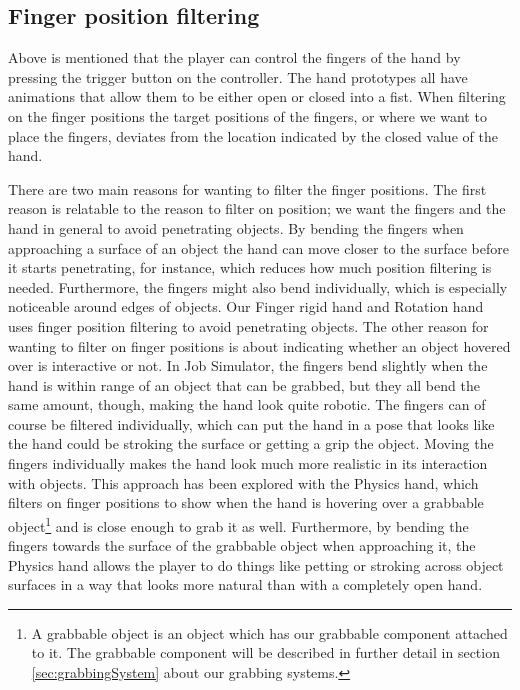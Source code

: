 \subsection{Finger position filtering}
\label{subsec:categoryFingerFiltering}
Above is mentioned that the player can control the fingers of the hand by pressing the trigger button on the controller. The hand prototypes all have animations that allow them to be either open or closed into a fist. When filtering on the finger positions the target positions of the fingers, or where we want to place the fingers, deviates from the location indicated by the closed value of the hand.

There are two main reasons for wanting to filter the finger positions. The first reason is relatable to the reason to filter on position; we want the fingers and the hand in general to avoid penetrating objects. By bending the fingers when approaching a surface of an object the hand can move closer to the surface before it starts penetrating, for instance, which reduces how much position filtering is needed. Furthermore, the fingers might also bend individually, which is especially noticeable around edges of objects. Our Finger rigid hand and Rotation hand uses finger position filtering to avoid penetrating objects. The other reason for wanting to filter on finger positions is about indicating whether an object hovered over is interactive or not. In Job Simulator, the fingers bend slightly when the hand is within range of an object that can be grabbed, but they all bend the same amount, though, making the hand look quite robotic. The fingers can of course be filtered individually, which can put the hand in a pose that looks like the hand could be stroking the surface or getting a grip the object. Moving the fingers individually makes the hand look much more realistic in its interaction with objects. This approach has been explored with the Physics hand, which filters on finger positions to show when the hand is hovering over a grabbable object\footnote{A grabbable object is an object which has our grabbable component attached to it. The grabbable component will be described in further detail in section \ref{sec:grabbingSystem} about our grabbing systems.} and is close enough to grab it as well. Furthermore, by bending the fingers towards the surface of the grabbable object when approaching it, the Physics hand allows the player to do things like petting or stroking across object surfaces in a way that looks more natural than with a completely open hand.

